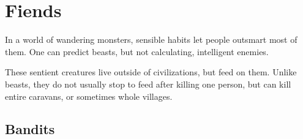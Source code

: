 \chapter[Fiends in the Forest]{Fiends}
\label{fiends}

\toggletrue{genExamples}

In a world of wandering monsters, sensible habits let people outsmart most of them.
One can predict beasts, but not calculating, intelligent enemies.

These sentient creatures live outside of civilizations, but feed on them.
Unlike beasts, they do not usually stop to feed after killing one person, but can kill entire caravans, or sometimes whole \glspl{village}.

\section{Bandits}
\label{bandit}

